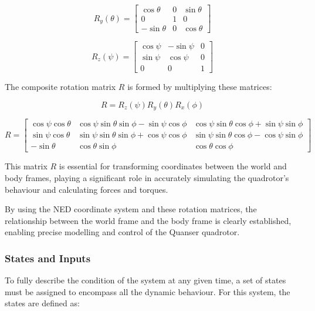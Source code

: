 \documentclass{UoNMCHA}
\numberwithin{equation}{section}
\begin{document}
    \begin{equation}
    R_y(\theta) = \begin{bmatrix}
    \cos\theta & 0 & \sin\theta \\
    0 & 1 & 0 \\
    -\sin\theta & 0 & \cos\theta
    \end{bmatrix}
    \label{eq:rotation_matrix_y}
    \end{equation}
    
    \begin{equation}
    R_z(\psi) = \begin{bmatrix}
    \cos\psi & -\sin\psi & 0 \\
    \sin\psi & \cos\psi & 0 \\
    0 & 0 & 1
    \end{bmatrix}
    \label{eq:rotation_matrix_z}
    \end{equation}
    

The composite rotation matrix \(R\) is formed by multiplying these matrices:

\begin{equation}
    R = R_z(\psi) R_y(\theta) R_x(\phi)
    \label{eq:combined_rotation_matrix}
    \end{equation}
    
    \begin{equation}
    R = \begin{bmatrix}
    \cos\psi \cos\theta & \cos\psi \sin\theta \sin\phi - \sin\psi \cos\phi & \cos\psi \sin\theta \cos\phi + \sin\psi \sin\phi \\
    \sin\psi \cos\theta & \sin\psi \sin\theta \sin\phi + \cos\psi \cos\phi & \sin\psi \sin\theta \cos\phi - \cos\psi \sin\phi \\
    -\sin\theta & \cos\theta \sin\phi & \cos\theta \cos\phi
    \end{bmatrix}
    \label{eq:expanded_rotation_matrix}
    \end{equation}
    

This matrix \(R\) is essential for transforming coordinates between the world and body frames, playing a significant role in accurately simulating the quadrotor's behaviour and calculating forces and torques.

By using the NED coordinate system and these rotation matrices, the relationship between the world frame and the body frame is clearly established, enabling precise modelling and control of the Quanser quadrotor.

\subsubsection{States and Inputs}
To fully describe the condition of the system at any given time, a set of states must be assigned to encompass all the dynamic behaviour. For this system, the states are defined as:
\end{document}
